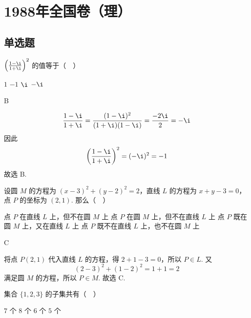 \documentclass[UTF8,a4paper,oneside,11pt]{ctexbook}
\begin{document}
\mainmatter

\chapter{1988年全国卷（理）}

\section{单选题}

\begin{problem}

\(\left(\frac{1 - \i}{1 + \i}\right)^2\) 的值等于（\(\quad\)）

\choices
    {\(1\)}
    {\(-1\)}
    {\(\i\)}
    {\(-\i\)}
\end{problem}

\begin{answer}
B
\end{answer}

\begin{solution}
\[
\frac{1-\i}{1+\i}=\frac{(1-\i)^2}{(1+\i)(1-\i)}=\frac{-2\i}{2}=-\i
\]
因此
\[
\left(\frac{1-\i}{1+\i}\right)^2=(-\i)^2=-1
\]
故选 B.
\end{solution}


\begin{problem}

设圆 \(M\) 的方程为 \((x - 3)^2 + (y - 2)^2 = 2\)，直线 \(L\) 的方程为 \(x + y - 3 = 0\)，点 \(P\) 的坐标为 \((2,1)\). 那么（\(\quad\)）

\choices
    {点 \(P\) 在直线 \(L\) 上，但不在圆 \(M\) 上}
    {点 \(P\) 在圆 \(M\) 上，但不在直线 \(L\) 上}
    {点 \(P\) 既在圆 \(M\) 上，又在直线 \(L\) 上}
    {点 \(P\) 既不在直线 \(L\) 上，也不在圆 \(M\) 上}
\end{problem}

\begin{answer}
C
\end{answer}

\begin{solution}
将点 \(P(2,1)\) 代入直线 \(L\) 的方程，得 \(2+1-3=0\)，所以 \(P\in L\). 又
\[
(2-3)^2+(1-2)^2=1+1=2
\]
满足圆 \(M\) 的方程，所以 \(P\in M\). 故选 C.
\end{solution}

\begin{problem}

集合 \(\{1,2,3\}\) 的子集共有（\(\quad\)）

\choices
    {\(7\) 个}
    {\(8\) 个}
    {\(6\) 个}
    {\(5\) 个}
\end{problem}
\end{document}
